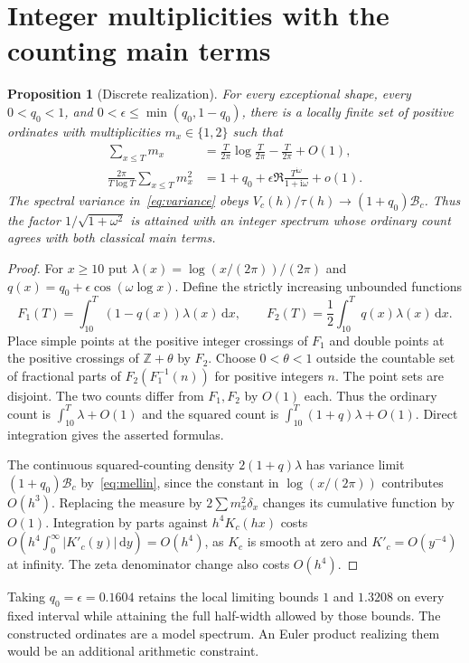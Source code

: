 \documentclass[11pt,letterpaper]{article}
\newtheorem{proposition}[theorem]{Proposition}
\newcommand{\Z}{\mathbb Z}
\newcommand{\dd}{\,\mathrm d}
\newcommand{\ii}{\mathrm i}
\newcommand{\abs}[1]{\lvert#1\rvert}
\newcommand{\BB}{\mathcal B}
\begin{document}
\section{Integer multiplicities with the counting main terms}\label{sec:discrete}
\begin{proposition}[Discrete realization]\label{prop:discrete}
For every exceptional shape, every $0<q_0<1$, and $0<\epsilon\le\min(q_0,1-q_0)$, there is a locally finite set of positive ordinates with multiplicities $m_x\in\{1,2\}$ such that
\begin{align*}
 \sum_{x\le T}m_x&=\frac{T}{2\pi}\log\frac{T}{2\pi}-\frac{T}{2\pi}+O(1),\\
 \frac{2\pi}{T\log T}\sum_{x\le T}m_x^2
 &=1+q_0+\epsilon\Re\frac{T^{\ii\omega}}{1+\ii\omega}+o(1).
\end{align*}
The spectral variance in~\eqref{eq:variance} obeys $V_c(h)/\tau(h)\to(1+q_0)\BB_c$. Thus the factor $1/\sqrt{1+\omega^2}$ is attained with an integer spectrum whose ordinary count agrees with both classical main terms.
\end{proposition}
\begin{proof}
For $x\ge10$ put $\lambda(x)=\log(x/(2\pi))/(2\pi)$ and $q(x)=q_0+\epsilon\cos(\omega\log x)$. Define the strictly increasing unbounded functions
\[
 F_1(T)=\int_{10}^T(1-q(x))\lambda(x)\dd x,\qquad F_2(T)=\frac12\int_{10}^T q(x)\lambda(x)\dd x .
\]
Place simple points at the positive integer crossings of $F_1$ and double points at the positive crossings of $\Z+\theta$ by $F_2$. Choose $0<\theta<1$ outside the countable set of fractional parts of $F_2(F_1^{-1}(n))$ for positive integers $n$. The point sets are disjoint. The two counts differ from $F_1,F_2$ by $O(1)$ each. Thus the ordinary count is $\int_{10}^T\lambda+O(1)$ and the squared count is $\int_{10}^T(1+q)\lambda+O(1)$. Direct integration gives the asserted formulas.

The continuous squared-counting density $2(1+q)\lambda$ has variance limit $(1+q_0)\BB_c$ by~\eqref{eq:mellin}, since the constant in $\log(x/(2\pi))$ contributes $O(h^3)$. Replacing the measure by $2\sum m_x^2\delta_x$ changes its cumulative function by $O(1)$. Integration by parts against $h^4K_c(hx)$ costs $O(h^4\int_0^\infty\abs{K'_c(y)}\dd y)=O(h^4)$, as $K_c$ is smooth at zero and $K'_c=O(y^{-4})$ at infinity. The zeta denominator change also costs $O(h^4)$.
\end{proof}
Taking $q_0=\epsilon=0.1604$ retains the local limiting bounds $1$ and $1.3208$ on every fixed interval while attaining the full half-width allowed by those bounds. The constructed ordinates are a model spectrum. An Euler product realizing them would be an additional arithmetic constraint.
\end{document}
